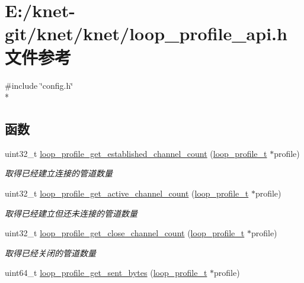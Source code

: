 \hypertarget{a00080}{}\section{E\+:/knet-\/git/knet/knet/loop\+\_\+profile\+\_\+api.h 文件参考}
\label{a00080}
{\ttfamily \#include \char`\"{}config.\+h\char`\"{}}\\*
\subsection*{函数}
\begin{DoxyCompactItemize}
\item 
uint32\+\_\+t \hyperlink{a00080_a45226aca5f27c8d49cc7b405409fc958_a45226aca5f27c8d49cc7b405409fc958}{loop\+\_\+profile\+\_\+get\+\_\+established\+\_\+channel\+\_\+count} (\hyperlink{a00051_ad060e1396346d2f5db1ec0597376a107_ad060e1396346d2f5db1ec0597376a107}{loop\+\_\+profile\+\_\+t} $\ast$profile)
\begin{DoxyCompactList}\small\item\em 取得已经建立连接的管道数量 \end{DoxyCompactList}\item 
uint32\+\_\+t \hyperlink{a00080_a25e7659843c550c5d2147286ad1b48ae_a25e7659843c550c5d2147286ad1b48ae}{loop\+\_\+profile\+\_\+get\+\_\+active\+\_\+channel\+\_\+count} (\hyperlink{a00051_ad060e1396346d2f5db1ec0597376a107_ad060e1396346d2f5db1ec0597376a107}{loop\+\_\+profile\+\_\+t} $\ast$profile)
\begin{DoxyCompactList}\small\item\em 取得已经建立但还未连接的管道数量 \end{DoxyCompactList}\item 
uint32\+\_\+t \hyperlink{a00080_a5fd58f572ac680a32930d275c5854e8e_a5fd58f572ac680a32930d275c5854e8e}{loop\+\_\+profile\+\_\+get\+\_\+close\+\_\+channel\+\_\+count} (\hyperlink{a00051_ad060e1396346d2f5db1ec0597376a107_ad060e1396346d2f5db1ec0597376a107}{loop\+\_\+profile\+\_\+t} $\ast$profile)
\begin{DoxyCompactList}\small\item\em 取得已经关闭的管道数量 \end{DoxyCompactList}\item 
uint64\+\_\+t \hyperlink{a00080_ad8eec173abe7c0e50137b6ac74c2c817_ad8eec173abe7c0e50137b6ac74c2c817}{loop\+\_\+profile\+\_\+get\+\_\+sent\+\_\+bytes} (\hyperlink{a00051_ad060e1396346d2f5db1ec0597376a107_ad060e1396346d2f5db1ec0597376a107}{loop\+\_\+profile\+\_\+t} $\ast$profile)

\end{DoxyCompactItemize}
